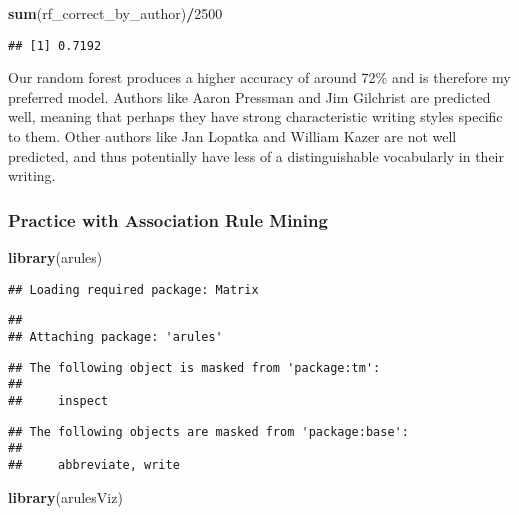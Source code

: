 \documentclass[]{article}
\newenvironment{Shaded}{\begin{snugshade}}{\end{snugshade}}
\newcommand{\KeywordTok}[1]{\textcolor[rgb]{0.13,0.29,0.53}{\textbf{#1}}}
\newcommand{\DecValTok}[1]{\textcolor[rgb]{0.00,0.00,0.81}{#1}}
\newcommand{\OperatorTok}[1]{\textcolor[rgb]{0.81,0.36,0.00}{\textbf{#1}}}
\newcommand{\NormalTok}[1]{#1}
\begin{document}
\begin{Shaded}
\begin{Highlighting}[]
\KeywordTok{sum}\NormalTok{(rf_correct_by_author)}\OperatorTok{/}\DecValTok{2500}
\end{Highlighting}
\end{Shaded}

\begin{verbatim}
## [1] 0.7192
\end{verbatim}

Our random forest produces a higher accuracy of around 72\% and is
therefore my preferred model. Authors like Aaron Pressman and Jim
Gilchrist are predicted well, meaning that perhaps they have strong
characteristic writing styles specific to them. Other authors like Jan
Lopatka and William Kazer are not well predicted, and thus potentially
have less of a distinguishable vocabularly in their writing.

\subsubsection{Practice with Association Rule
Mining}\label{practice-with-association-rule-mining}

\begin{Shaded}
\begin{Highlighting}[]
\KeywordTok{library}\NormalTok{(arules)}
\end{Highlighting}
\end{Shaded}

\begin{verbatim}
## Loading required package: Matrix
\end{verbatim}

\begin{verbatim}
## 
## Attaching package: 'arules'
\end{verbatim}

\begin{verbatim}
## The following object is masked from 'package:tm':
## 
##     inspect
\end{verbatim}

\begin{verbatim}
## The following objects are masked from 'package:base':
## 
##     abbreviate, write
\end{verbatim}

\begin{Shaded}
\begin{Highlighting}[]
\KeywordTok{library}\NormalTok{(arulesViz)}
\end{Highlighting}
\end{Shaded}
\end{document}
